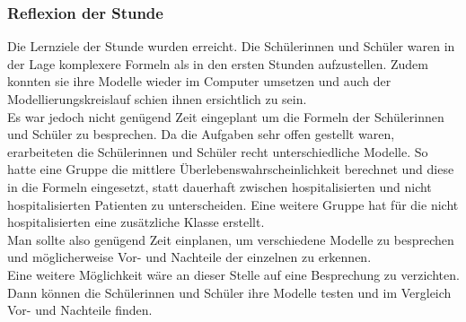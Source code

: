 \subsubsection{Reflexion der Stunde}
Die Lernziele der Stunde wurden erreicht. Die Schülerinnen und Schüler waren in der Lage komplexere Formeln als in den ersten Stunden aufzustellen. Zudem konnten sie ihre Modelle wieder im Computer umsetzen und auch der Modellierungskreislauf schien ihnen ersichtlich zu sein.\\
Es war jedoch nicht genügend Zeit eingeplant um die Formeln der Schülerinnen und Schüler zu besprechen. Da die Aufgaben sehr offen gestellt waren, erarbeiteten die Schülerinnen und Schüler recht unterschiedliche Modelle. So hatte eine Gruppe die mittlere Überlebenswahrscheinlichkeit berechnet und diese in die Formeln eingesetzt, statt dauerhaft zwischen hospitalisierten und nicht hospitalisierten Patienten zu unterscheiden. Eine weitere Gruppe hat für die nicht hospitalisierten eine zusätzliche Klasse erstellt.\\
Man sollte also genügend Zeit einplanen, um verschiedene Modelle zu besprechen und möglicherweise Vor- und Nachteile der einzelnen zu erkennen.\\
Eine weitere Möglichkeit wäre an dieser Stelle auf eine Besprechung zu verzichten. Dann können die Schülerinnen und Schüler ihre Modelle testen und im Vergleich Vor- und Nachteile finden. \\

\newpage
